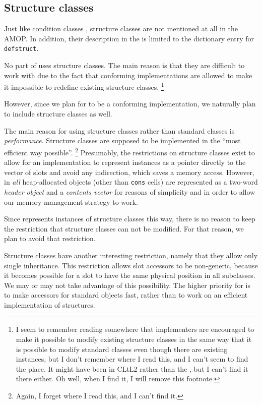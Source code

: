 \subsection{Structure classes}
\label{object-system-structure-classes}

Just like condition classes ,
structure classes are not mentioned at all in the AMOP.  In addition,
their description in the \hs{} is limited to the dictionary entry
for \texttt{defstruct}.  

No part of \sysname{} uses structure classes.  The main reason is that
they are difficult to work with due to the fact that conforming
implementations are allowed to make it impossible to redefine
existing structure classes.%
\footnote{I seem to remember reading somewhere that implementers are
  encouraged to make it possible to modify existing structure classes
  in the same way that it is possible to modify standard classes even
  though there are existing instances, but I don't remember where I
  read this, and I can't seem to find the place.  It might have been
  in CLtL2 rather than the \hs{}, but I can't find it there
  either.  Oh well, when I find it, I will remove this footnote.}

However, since we plan for \sysname{} to be a conforming
implementation, we naturally plan to include structure classes as
well. 

The main reason for using structure classes rather than standard
classes is \emph{performance}.  Structure classes are supposed to be
implemented in the ``most efficient way possible''.%
\footnote{Again, I forget where I read this, and I can't find it.}
Presumably, the restrictions on structure classes exist to allow for
an implementation to represent instances as a pointer directly to the
vector of slots and avoid any indirection, which saves a memory
access.  However, in \sysname{} \emph{all} heap-allocated objects
(other than \texttt{cons} cells) are represented as a two-word
\emph{header object} and a \emph{contents vector} for reasons of
simplicity and in order to allow our memory-management strategy to
work.

Since \sysname{} represents instances of structure classes this way,
there is no reason to keep the restriction that structure classes can
not be modified.  For that reason, we plan to avoid that restriction.

Structure classes have another interesting restriction, namely that
they allow only single inheritance.  This restriction allows slot
accessors to be non-generic, because it becomes possible for a slot to
have the same physical position in all subclasses.  We may or may not
take advantage of this possibility.  The higher priority for
\sysname{} is to make accessors for standard objects fast, rather than
to work on an efficient implementation of structures. 

